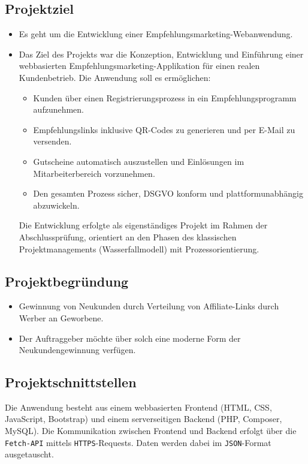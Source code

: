 \subsection{Projektziel} 
\label{sec:Projektziel}
\begin{itemize}
	\item Es geht um die Entwicklung einer Empfehlungsmarketing-Webanwendung.
	\item Das Ziel des Projekts war die Konzeption, Entwicklung und Einführung einer webbasierten Empfehlungsmarketing-Applikation für einen realen Kundenbetrieb.
    Die Anwendung soll es ermöglichen:
    \begin{itemize}
    \item Kunden über einen Registrierungsprozess in ein Empfehlungsprogramm aufzunehmen.
    \item Empfehlungslinks inklusive QR-Codes zu generieren und per E-Mail zu versenden.
    \item Gutscheine automatisch auszustellen und Einlösungen im Mitarbeiterbereich vorzunehmen.
    \item Den gesamten Prozess sicher, \acs{DSGVO} konform und plattformunabhängig abzuwickeln.    
    \end{itemize}
Die Entwicklung erfolgte als eigenständiges Projekt im Rahmen der Abschlussprüfung, orientiert an den Phasen des klassischen Projektmanagements (Wasserfallmodell) mit Prozessorientierung.
\end{itemize}

\subsection{Projektbegründung} 
\label{sec:Projektbegruendung}
\begin{itemize}
	\item Gewinnung von Neukunden durch Verteilung von Affiliate-Links durch Werber an Geworbene.
	\item Der Auftraggeber möchte über solch eine moderne Form der Neukundengewinnung verfügen.
\end{itemize}


\subsection{Projektschnittstellen} 
\label{sec:Projektschnittstellen}
Die Anwendung besteht aus einem webbasierten Frontend (HTML, CSS, JavaScript, Bootstrap) und einem serverseitigen Backend (PHP, Composer, MySQL).  
Die Kommunikation zwischen Frontend und Backend erfolgt über die \texttt{Fetch-API} mittels \texttt{HTTPS}-Requests.  
Daten werden dabei im \texttt{JSON}-Format ausgetauscht.  

